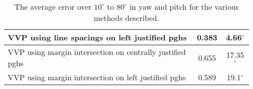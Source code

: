 \begin{table}[t]
\begin{center}
\begin{tabular}{|p{95mm}|c|c|}
      VVP using line spacings on left justified pghs & 0.383 & 4.66$^\circ$ \\ \hline
      VVP using margin intersection on centrally justified pghs & 0.655 & 17.35$^\circ$ \\ \hline  
      VVP using margin intersection on left justified pghs & 0.589 & 19.1$^\circ$ \\   \hline
   \end{tabular}
  \end{center}
  \caption{The average error over $10^\circ$ to $80^{\circ}$ in yaw and pitch for the various methods described.}
  \label{accuracytable}
\end{table}

